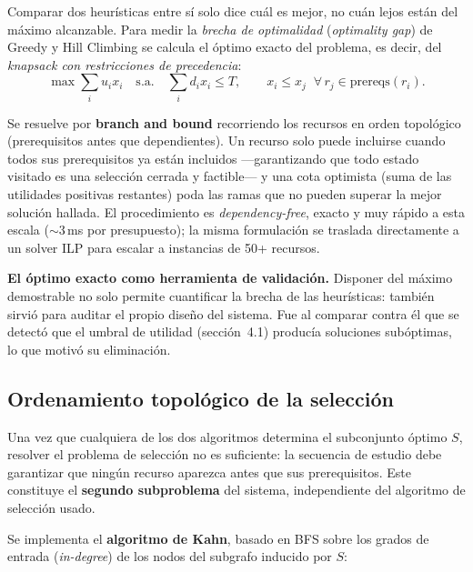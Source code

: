 \documentclass[11pt, a4paper]{article}
\begin{document}
Comparar dos heurísticas entre sí solo dice cuál es mejor, no cuán lejos
están del máximo alcanzable. Para medir la \emph{brecha de optimalidad}
(\textit{optimality gap}) de Greedy y Hill Climbing se calcula el óptimo
exacto del problema, es decir, del \emph{knapsack con restricciones de
precedencia}:
\[
\max \sum_i u_i x_i
\quad \text{s.a.}\quad
\sum_i d_i x_i \le T,\qquad
x_i \le x_j \;\; \forall\, r_j \in \mathrm{prereqs}(r_i).
\]

Se resuelve por \textbf{branch and bound} recorriendo los recursos en orden
topológico (prerequisitos antes que dependientes). Un recurso solo puede
incluirse cuando todos sus prerequisitos ya están incluidos —garantizando que
todo estado visitado es una selección cerrada y factible— y una cota
optimista (suma de las utilidades positivas restantes) poda las ramas que no
pueden superar la mejor solución hallada. El procedimiento es
\emph{dependency-free}, exacto y muy rápido a esta escala ($\sim 3$\,ms por
presupuesto); la misma formulación se traslada directamente a un solver ILP
para escalar a instancias de 50+ recursos.

\begin{notebox}
\textbf{El óptimo exacto como herramienta de validación.} Disponer del máximo
demostrable no solo permite cuantificar la brecha de las heurísticas: también
sirvió para auditar el propio diseño del sistema. Fue al comparar contra él
que se detectó que el umbral de utilidad (sección~4.1) producía soluciones
subóptimas, lo que motivó su eliminación.
\end{notebox}

\subsection{Ordenamiento topológico de la selección}

Una vez que cualquiera de los dos algoritmos determina el subconjunto óptimo
$S$, resolver el problema de selección no es suficiente: la secuencia de
estudio debe garantizar que ningún recurso aparezca antes que sus
prerequisitos. Este constituye el \textbf{segundo subproblema} del sistema,
independiente del algoritmo de selección usado.

Se implementa el \textbf{algoritmo de Kahn}, basado en BFS sobre los grados
de entrada (\textit{in-degree}) de los nodos del subgrafo inducido por $S$:
\end{document}
